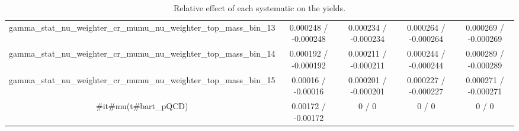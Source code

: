 \documentclass[10pt]{article}
\begin{document}
\begin{table}[htbp]
\begin{center}
\begin{tabular}{|c|c|c|c|c|}
  gamma_stat_nu_weighter_cr_mumu_nu_weighter_top_mass_bin_13 & 0.000248 / -0.000248 & 0.000234 / -0.000234 & 0.000264 / -0.000264 & 0.000269 / -0.000269 \\ 
  gamma_stat_nu_weighter_cr_mumu_nu_weighter_top_mass_bin_14 & 0.000192 / -0.000192 & 0.000211 / -0.000211 & 0.000244 / -0.000244 & 0.000289 / -0.000289 \\ 
  gamma_stat_nu_weighter_cr_mumu_nu_weighter_top_mass_bin_15 & 0.00016 / -0.00016 & 0.000201 / -0.000201 & 0.000227 / -0.000227 & 0.000271 / -0.000271 \\ 
  #it{#mu}(t#bar{t}_{pQCD}) & 0.00172 / -0.00172 & 0 / 0 & 0 / 0 & 0 / 0 \\ 
\hline 
\end{tabular} 
\caption{Relative effect of each systematic on the yields.} 
\end{center} 
\end{table} 
\end{document}
